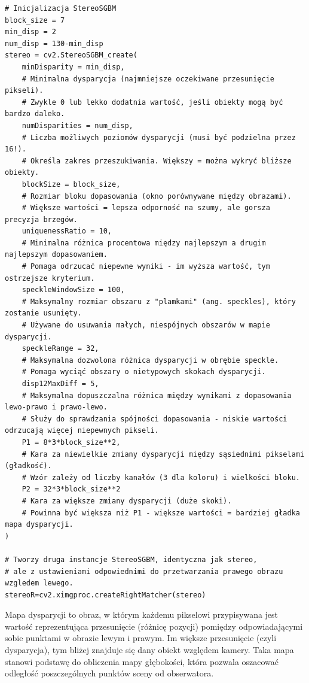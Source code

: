 \documentclass[magisterska]{pracadypl}
\begin{document}
\begin{lstlisting}[style=mypython]
# Inicjalizacja StereoSGBM
block_size = 7
min_disp = 2
num_disp = 130-min_disp
stereo = cv2.StereoSGBM_create(
    minDisparity = min_disp,
    # Minimalna dysparycja (najmniejsze oczekiwane przesunięcie pikseli).
    # Zwykle 0 lub lekko dodatnia wartość, jeśli obiekty mogą być bardzo daleko.
    numDisparities = num_disp,
    # Liczba możliwych poziomów dysparycji (musi być podzielna przez 16!).
    # Określa zakres przeszukiwania. Większy = można wykryć bliższe obiekty.
    blockSize = block_size,
    # Rozmiar bloku dopasowania (okno porównywane między obrazami).
    # Większe wartości = lepsza odporność na szumy, ale gorsza precyzja brzegów.
    uniquenessRatio = 10,
    # Minimalna różnica procentowa między najlepszym a drugim najlepszym dopasowaniem.
    # Pomaga odrzucać niepewne wyniki - im wyższa wartość, tym ostrzejsze kryterium.
    speckleWindowSize = 100,
    # Maksymalny rozmiar obszaru z "plamkami" (ang. speckles), który zostanie usunięty.
    # Używane do usuwania małych, niespójnych obszarów w mapie dysparycji.
    speckleRange = 32,
    # Maksymalna dozwolona różnica dysparycji w obrębie speckle.
    # Pomaga wyciąć obszary o nietypowych skokach dysparycji.
    disp12MaxDiff = 5,
    # Maksymalna dopuszczalna różnica między wynikami z dopasowania lewo-prawo i prawo-lewo.
    # Służy do sprawdzania spójności dopasowania - niskie wartości odrzucają więcej niepewnych pikseli.
    P1 = 8*3*block_size**2,
    # Kara za niewielkie zmiany dysparycji między sąsiednimi pikselami (gładkość).
    # Wzór zależy od liczby kanałów (3 dla koloru) i wielkości bloku.
    P2 = 32*3*block_size**2
    # Kara za większe zmiany dysparycji (duże skoki).
    # Powinna być większa niż P1 - większe wartości = bardziej gładka mapa dysparycji.
)

# Tworzy druga instancje StereoSGBM, identyczna jak stereo,
# ale z ustawieniami odpowiednimi do przetwarzania prawego obrazu wzgledem lewego.
stereoR=cv2.ximgproc.createRightMatcher(stereo)
\end{lstlisting}

Mapa dysparycji\cite{disparity} to obraz, w którym każdemu pikselowi przypisywana jest wartość reprezentująca przesunięcie (różnicę pozycji) pomiędzy odpowiadającymi sobie punktami w obrazie lewym i prawym. Im większe przesunięcie (czyli dysparycja), tym bliżej znajduje się dany obiekt względem kamery. Taka mapa stanowi podstawę do obliczenia mapy głębokości, która pozwala oszacować odległość poszczególnych punktów sceny od obserwatora.
\end{document}
